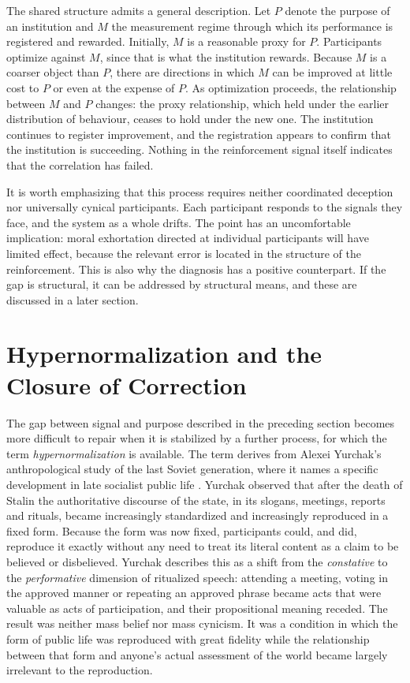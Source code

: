 \documentclass[11pt]{article}
\theoremstyle{definition}
\theoremstyle{remark}
\begin{document}
The shared structure admits a general description. Let $P$ denote the purpose of an institution and $M$ the measurement regime through which its performance is registered and rewarded. Initially, $M$ is a reasonable proxy for $P$. Participants optimize against $M$, since that is what the institution rewards. Because $M$ is a coarser object than $P$, there are directions in which $M$ can be improved at little cost to $P$ or even at the expense of $P$. As optimization proceeds, the relationship between $M$ and $P$ changes: the proxy relationship, which held under the earlier distribution of behaviour, ceases to hold under the new one. The institution continues to register improvement, and the registration appears to confirm that the institution is succeeding. Nothing in the reinforcement signal itself indicates that the correlation has failed.

It is worth emphasizing that this process requires neither coordinated deception nor universally cynical participants. Each participant responds to the signals they face, and the system as a whole drifts. The point has an uncomfortable implication: moral exhortation directed at individual participants will have limited effect, because the relevant error is located in the structure of the reinforcement. This is also why the diagnosis has a positive counterpart. If the gap is structural, it can be addressed by structural means, and these are discussed in a later section.

\section{Hypernormalization and the Closure of Correction}

The gap between signal and purpose described in the preceding section becomes more difficult to repair when it is stabilized by a further process, for which the term \emph{hypernormalization} is available. The term derives from Alexei Yurchak's anthropological study of the last Soviet generation, where it names a specific development in late socialist public life \cite{yurchak2006}. Yurchak observed that after the death of Stalin the authoritative discourse of the state, in its slogans, meetings, reports and rituals, became increasingly standardized and increasingly reproduced in a fixed form. Because the form was now fixed, participants could, and did, reproduce it exactly without any need to treat its literal content as a claim to be believed or disbelieved. Yurchak describes this as a shift from the \emph{constative} to the \emph{performative} dimension of ritualized speech: attending a meeting, voting in the approved manner or repeating an approved phrase became acts that were valuable as acts of participation, and their propositional meaning receded. The result was neither mass belief nor mass cynicism. It was a condition in which the form of public life was reproduced with great fidelity while the relationship between that form and anyone's actual assessment of the world became largely irrelevant to the reproduction.
\end{document}
